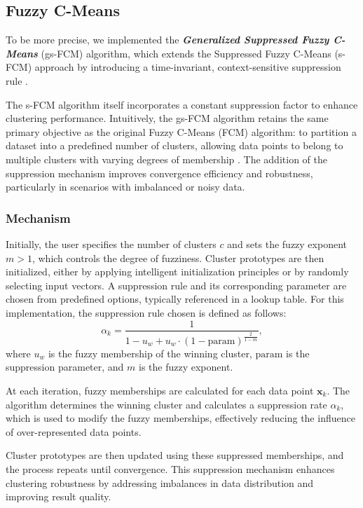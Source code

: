 \subsection{Fuzzy C-Means}
\label{subsec:methods-fuzzy-cmeans}

To be more precise, we implemented the \textbf{\textit{Generalized Suppressed Fuzzy C-Means}} (gs-FCM) algorithm,
which extends the Suppressed Fuzzy C-Means (s-FCM) approach by introducing a time-invariant,
context-sensitive suppression rule \cite{suppresedFCM, gsFCM}.
  
The s-FCM algorithm itself incorporates a constant suppression factor to enhance clustering
performance. Intuitively, the gs-FCM algorithm retains the same primary objective as the original 
Fuzzy C-Means (FCM) algorithm: to partition a dataset into a predefined number of clusters,
allowing data points to belong to multiple clusters with varying degrees of membership \cite{fcm}.
The addition of the suppression mechanism improves convergence efficiency and robustness,
particularly in scenarios with imbalanced or noisy data.

\subsubsection{Mechanism}

Initially, the user specifies the number of clusters \( c \) and sets the fuzzy exponent \( m > 1 \), which controls the degree of fuzziness. Cluster prototypes are then initialized, either by applying intelligent initialization principles or by randomly selecting input vectors. A suppression rule and its corresponding parameter are chosen from predefined options, typically referenced in a lookup table. For this implementation, the suppression rule chosen is defined as follows:
\[
\alpha_k = \frac{1}{1 - u_w + u_w \cdot \left(1 - \text{param}\right)^{\frac{2}{1-m}}},
\]
where \( u_w \) is the fuzzy membership of the winning cluster, \( \text{param} \) is the suppression parameter, and \( m \) is the fuzzy exponent.

At each iteration, fuzzy memberships are calculated for each data point \( \mathbf{x}_k \). The algorithm determines the winning cluster and calculates a suppression rate \( \alpha_k \), which is used to modify the fuzzy memberships, effectively reducing the influence of over-represented data points.

Cluster prototypes are then updated using these suppressed memberships, and the process repeats until convergence. This suppression mechanism enhances clustering robustness by addressing imbalances in data distribution and improving result quality.


